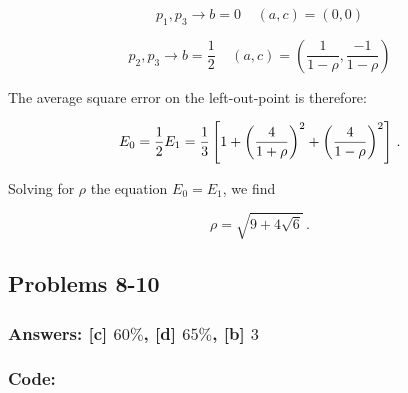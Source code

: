 \documentclass[11pt]{article}
\begin{document}
\begin{equation}
p_1,p_3 \rightarrow b=0 \;\;\;\;  (a,c)=\left(0,0\right)
\end{equation}

\begin{equation}
p_2,p_3 \rightarrow b=\frac{1}{2} \;\;\;\;  (a,c)=\left(\frac{1}{1-\rho},\frac{-1}{1-\rho}\right)
\end{equation}

The average square error on the left-out-point is therefore:

\begin{equation}
E_0=\frac{1}{2} \\
E_1=\frac{1}{3} \left[1 + \left(\frac{4}{1+\rho}\right)^2 + \left(\frac{4}{1-\rho}\right)^2 \right]\,.
\end{equation}

Solving for \(\rho\) the equation \(E_0=E_1\), we find

\begin{equation}
\rho=\sqrt{9+4\sqrt{6}}\,.
\end{equation}

    \hypertarget{problems-8-10}{%
\subsection{Problems 8-10}\label{problems-8-10}}

\hypertarget{answers-c-60-d-65-b-3}{%
\subsubsection{\texorpdfstring{Answers: {[}c{]} \(60 \%\), {[}d{]}
\(65 \%\), {[}b{]}
\(3\)}{Answers: {[}c{]} 60 \textbackslash{}\%, {[}d{]} 65 \textbackslash{}\%, {[}b{]} 3}}\label{answers-c-60-d-70-b-3}}

\hypertarget{code}{%
\subsubsection{Code:}\label{code}}
\end{document}
